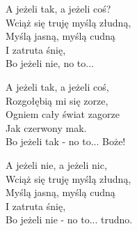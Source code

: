 
\begin{text}
    A jeżeli tak, a jeżeli coś?\\
    Wciąż się truję myślą złudną,\\
    Myślą jasną, myślą cudną\\
    I zatruta śnię,\\
    Bo jeżeli nie, no to...

    A jeżeli tak, a jeżeli coś,\\
    Rozgołębią mi się zorze,\\
    Ogniem cały świat zagorze\\
    Jak czerwony mak.\\
    Bo jeżeli tak - no to... Boże!

    A jeżeli nie, a jeżeli nic,\\
    Wciąż się truję myślą złudną,\\
    Myślą jasną, myślą cudną\\
    I zatruta śnię,\\
    Bo jeżeli nie - no to... trudno.
\end{text}
\begin{chord}

\end{chord}